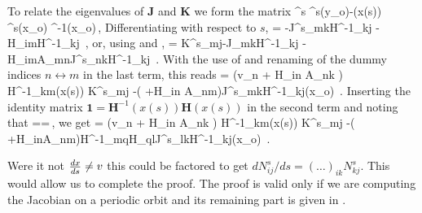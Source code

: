 \documentclass[pre,preprint,groupedaddress,showpacs,showkeys]{revtex4}
\begin{document}
  To relate the eigenvalues of $\mathbf{J}$ and $\mathbf{K}$ we form the matrix
  \beq
  	^s \equiv {}^s(y_o)-(x(s)) ^s(x_o) ^{-1}(x_o)\,,
	\label{eq:def:N}
  \eeq
  Differentiating with respect to $s$, 
  \beq
  	  =  -J^s_{mk}H^{-1}_{kj}
						-H_{im}H^{-1}_{kj} \,,
  \eeq
  or, using  and ,
  \beq
	  =  K^s_{mj}-J_{mk}H^{-1}_{kj}
						-H_{im}A_{mn}J^s_{nk}H^{-1}_{kj} \,.
  \eeq
  With the use of  and renaming of the dummy indices $n\leftrightarrow m$ in the last term, this reads
  \beq	
	 =   \left(v_n + H_{in} A_{nk} \right)
				H^{-1}_{km}(x(s)) K^s_{mj} 
				-\left(
						+H_{in} A_{nm}\right)J^s_{mk}H^{-1}_{kj}(x_o) \,.
  \eeq
  Inserting the identity matrix $\mathbf{1} = \mathbf{H}^{-1}(x(s))\mathbf{H}(x(s))$ in the second term and noting that
  \beq
  	==\,,
  \eeq
  we get
  \beq	
	 =  \left(v_n + H_{in} A_{nk} \right)
				H^{-1}_{km}(x(s)) K^s_{mj} 
				-\left(
						+H_{in}A_{nm}\right)H^{-1}_{mq}H_{ql}J^s_{lk}H^{-1}_{kj}(x_o) \,.
	\label{eq:dNds}
  \eeq
  
  Were it not ${\frac{d x}{d s}} \neq v$ this could be factored to get $dN^s_{ij}/ds=(\ldots)_{ik}N^s_{kj}$. 
  This would allow us to complete the proof. The proof is valid only if we  are computing the 
  Jacobian on a periodic orbit and its remaining part is given in .  
     
   
%   
%    
   
\end{document}
